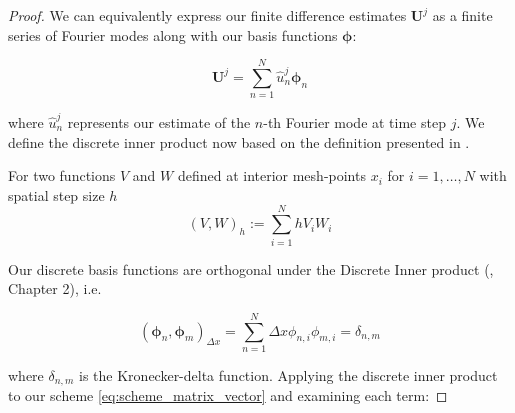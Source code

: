\begin{proof}
We can equivalently express our finite difference estimates $\mathbf{U}^j$
as a finite series of Fourier modes along with our basis functions 
$\boldsymbol{\phi}$:

\begin{equation*}
    \boldsymbol{U}^j = \sum_{n=1}^N \hat{u}_n^j \boldsymbol{\phi}_n
\end{equation*}

where $\hat{u}_n^j$ represents our estimate of the $n$-th Fourier 
mode at time step $j$. We define the discrete inner product now 
based on the definition presented in \cite{suli2025nspdes}. 

\begin{definition}
    For two functions $V$ and $W$ defined at interior mesh-points 
    $x_i$ for $i = 1, \dots, N$ with spatial step size $h$
    \begin{equation*}
        (V,W)_h := \sum_{i = 1}^{N} h V_i W_i
    \end{equation*}
\end{definition}

Our discrete basis functions are orthogonal under the Discrete Inner product 
(\cite{strang2007computational}, Chapter 2), i.e.

\begin{equation*}
    (\boldsymbol{\phi}_n, \boldsymbol{\phi}_m)_{\Delta x} 
    = \sum_{n=1}^N \Delta x \phi_{n,i} \phi_{m,i} = \delta_{n,m}
\end{equation*}

where $\delta_{n,m}$ is the Kronecker-delta function.
Applying the discrete inner product to our 
scheme \eqref{eq:scheme_matrix_vector} and examining each term:


\end{proof}
